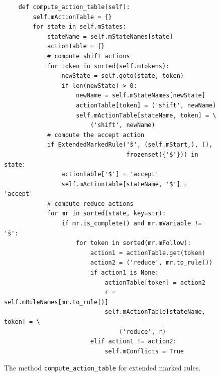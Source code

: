 \begin{figure}[!ht]
\centering
\begin{verbatim}
    def compute_action_table(self):
        self.mActionTable = {}
        for state in self.mStates:
            stateName = self.mStateNames[state]
            actionTable = {}
            # compute shift actions
            for token in sorted(self.mTokens):
                newState = self.goto(state, token)
                if len(newState) > 0:
                    newName = self.mStateNames[newState]
                    actionTable[token] = ('shift', newName)
                    self.mActionTable[stateName, token] = \
                        ('shift', newName)
            # compute the accept action
            if ExtendedMarkedRule('ŝ', (self.mStart,), (),
                                  frozenset({'$'})) in state:
                actionTable['$'] = 'accept'
                self.mActionTable[stateName, '$'] = 'accept'
            # compute reduce actions
            for mr in sorted(state, key=str):
                if mr.is_complete() and mr.mVariable != 'ŝ':
                    for token in sorted(mr.mFollow):
                        action1 = actionTable.get(token)
                        action2 = ('reduce', mr.to_rule())
                        if action1 is None:
                            actionTable[token] = action2
                            r = self.mRuleNames[mr.to_rule()]
                            self.mActionTable[stateName, token] = \
                                ('reduce', r)
                        elif action1 != action2:
                            self.mConflicts = True
\end{verbatim}
\vspace*{-0.3cm}
\caption{The method \texttt{compute\_action\_table} for extended marked rules.}
\label{fig:05-LR-Table-Generator.ipynb:compute_action_table}
\end{figure}

